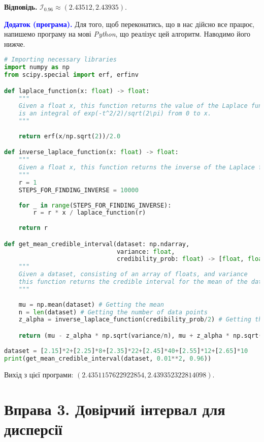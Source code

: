 \documentclass{../hw_template}
\begin{document}
\textbf{Відповідь.} $\mathcal{I}_{0.96} \approx (2.43512, 2.43935)$.

\textcolor{blue}{\textbf{Додаток (програма).}} Для того, щоб переконатись, що в нас дійсно все працює, напишемо програму на мові \textit{Python}, що реалізує цей алгоритм. Наводимо його нижче.

\begin{lstlisting}[language=Python]
# Importing necessary libraries
import numpy as np 
from scipy.special import erf, erfinv

def laplace_function(x: float) -> float:
    """
    Given a float x, this function returns the value of the Laplace function at x, which
    is an integral of exp(-t^2/2)/sqrt(2\pi) from 0 to x.
    """
    
    return erf(x/np.sqrt(2))/2.0

def inverse_laplace_function(x: float) -> float:
    """
    Given a float x, this function returns the inverse of the Laplace function at x
    """
    r = 1
    STEPS_FOR_FINDING_INVERSE = 10000
    
    for _ in range(STEPS_FOR_FINDING_INVERSE):
        r = r * x / laplace_function(r)
    
    return r

def get_mean_credible_interval(dataset: np.ndarray, 
                               variance: float,
                               credibility_prob: float) -> [float, float]:
    """
    Given a dataset, consisting of an array of floats, and variance 
    this function returns the credible interval for the mean of the dataset.
    """
    
    mu = np.mean(dataset) # Getting the mean
    n = len(dataset) # Getting the number of data points
    z_alpha = inverse_laplace_function(credibility_prob/2) # Getting the z_alpha value

    return (mu - z_alpha * np.sqrt(variance/n), mu + z_alpha * np.sqrt(variance/n))
    
dataset = [2.15]*2+[2.25]*8+[2.35]*22+[2.45]*40+[2.55]*12+[2.65]*10
print(get_mean_credible_interval(dataset, 0.01**2, 0.96))
\end{lstlisting}

Вихід з цієї програми: $(2.4351157622922854, 2.439352322814098)$.

\pagebreak

\section{Вправа 3. Довірчий інтервал для дисперсії}
\end{document}

